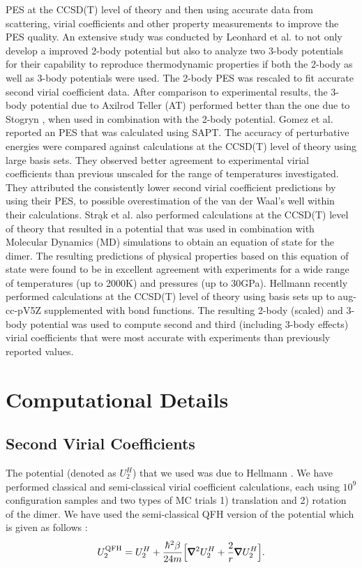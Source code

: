 \abinitio{} PES at the CCSD(T) level of theory and then using accurate data from scattering, virial coefficients and other property measurements to improve the PES quality. An extensive \abinitio{} study was conducted by Leonhard et al. \cite{Leonhard2002} to not only develop a improved 2-body potential but also to analyze two 3-body potentials for their capability to reproduce thermodynamic properties if both the 2-body as well as 3-body potentials were used. The 2-body \abinitio{} PES was rescaled to fit accurate second virial coefficient data. After comparison to experimental results, the 3-body potential due to Axilrod Teller (AT) \cite{Axilrod1943} performed better than the one due to Stogryn \cite{Stogryn1969}, when used in combination with the 2-body potential. Gomez et al. \cite{Gomez2007} reported an \abinitio{} PES that was calculated using SAPT. The accuracy of perturbative energies were compared against calculations at the CCSD(T) level of theory using large basis sets. They observed better agreement to experimental virial coefficients than previous unscaled \PESs{} for the range of temperatures investigated. They attributed the consistently lower second virial coefficient predictions by using their PES, to possible overestimation of the van der Waal's well within their calculations. Str\k{a}k et al. \cite{Strak2007} also performed \abinitio{} calculations at the CCSD(T) level of theory that resulted in a potential that was used in combination with Molecular Dynamics (MD) simulations to obtain an equation of state for the dimer. The resulting predictions of physical properties based on this equation of state were found to be in excellent agreement with experiments for a wide range of temperatures (up to 2000K) and pressures (up to 30GPa). Hellmann \cite{Hellmann2013} recently performed \abinitio{} calculations at the CCSD(T) level of theory using basis sets up to aug-cc-pV5Z supplemented with bond functions. The resulting 2-body (scaled) and 3-body potential was used to compute second and third (including 3-body effects) virial coefficients that were most accurate with experiments than previously reported values.
\section{Computational Details}
    \subsection{Second Virial Coefficients}
    \label{subsubsec:b2n2}
        The \abinitio{} potential (denoted as $U_2^H$) that we used was due to Hellmann \cite{Hellmann2013}. We have performed classical and semi-classical virial coefficient calculations, each using $10^9$ configuration samples and two types of MC trials 1) translation and 2) rotation of the dimer. We have used the semi-classical QFH version of the potential which is given as follows \cite{Feynman,Schenter2002}:
        \begin{equation}
        \label{eq:QFH}
            U_2^{\rm QFH} = U_2^H + \displaystyle\frac{\hbar^2 \beta}{24 m} \Big[ \pmb{\nabla}^2 U_2^H + \frac{2}{r} \pmb{\nabla} U_2^H \Big].
        \end{equation}

